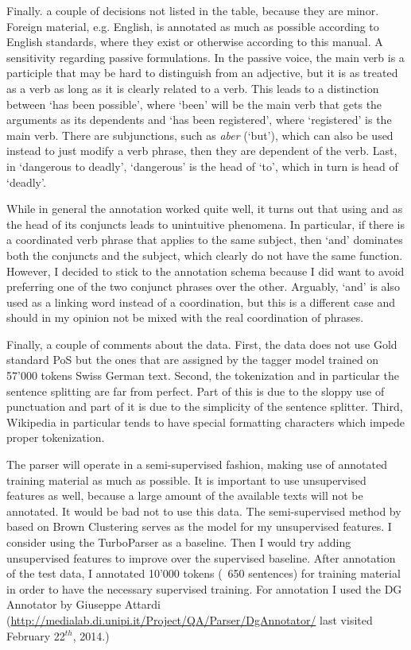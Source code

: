 \documentclass[11pt,letterpaper, covington]{article}
\begin{document}
Finally. a couple of decisions not listed in the table, because they are minor. Foreign material, e.g. English, is annotated as much as possible according to English standards, where they exist or otherwise according to this manual. A sensitivity regarding passive formulations. In the passive voice, the main verb is a participle that may be hard to distinguish from an adjective, but it is as treated as a verb as long as it is clearly related to a verb. This leads to a distinction between `has been possible', where `been' will be the main verb that gets the arguments as its dependents and `has been registered', where 	`registered' is the main verb. There are subjunctions, such as \emph{aber} (`but'), which can also be used instead to just modify a verb phrase, then they are dependent of the verb. Last, in `dangerous to deadly', `dangerous' is the head of `to', which in turn is head of `deadly'. 

While in general the annotation worked quite well, it turns out that using and as the head of its conjuncts leads to unintuitive phenomena. In particular, if there is a coordinated verb phrase that applies to the same subject, then `and' dominates both the conjuncts and the subject, which clearly do not have the same function. However, I decided to stick to the annotation schema because I did want to avoid preferring one of the two conjunct phrases over the other. Arguably, `and' is also used as a linking word instead of a coordination, but this is a different case and should in my opinion not be mixed with the real coordination of phrases. 

Finally, a couple of comments about the data. First, the data does not use Gold standard PoS but the ones that are assigned by the tagger model trained on 57'000 tokens Swiss German text. Second, the tokenization and in particular the sentence splitting are far from perfect. Part of this is due to the sloppy use of punctuation and part of it is due to the simplicity of the sentence splitter. Third, Wikipedia in particular tends to have special formatting characters which impede proper tokenization. 

The parser will operate in a semi-supervised fashion, making use of annotated training material as much as possible. It is important to use unsupervised features as well, because a large amount of the available texts will not be annotated. It would be bad not to use this data. The semi-supervised method by \citet{KCC08} based on Brown Clustering serves as the model for my unsupervised features.  I consider using the TurboParser \citep{MSXAF10} as a baseline. Then I would try adding unsupervised features to improve over the supervised baseline.
After annotation of the test data, I annotated 10'000 tokens (~650 sentences) for training material in order to have the necessary supervised training. For annotation I used the DG Annotator by Giuseppe Attardi (\url{http://medialab.di.unipi.it/Project/QA/Parser/DgAnnotator/} last visited February 22$^{th}$, 2014.) 
\end{document}
